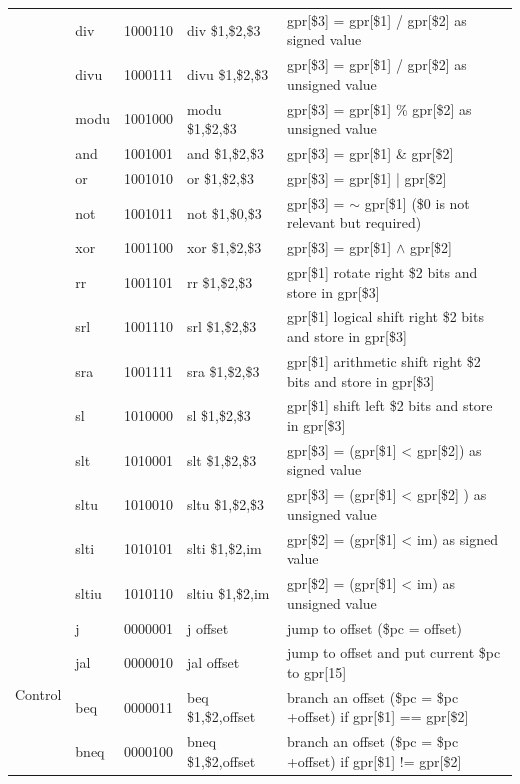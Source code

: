 \documentclass{sig-alternate}
\begin{document}
\begin{table}[p]
\begin{tabular}{|c|l|c|l|p{8cm}|}
 & div & 1000110 & div \$1,\$2,\$3 & gpr[\$3] = gpr[\$1] / gpr[\$2] as signed value \\ \cline{2-5}
 & divu & 1000111 & divu \$1,\$2,\$3 & gpr[\$3] = gpr[\$1] / gpr[\$2] as unsigned value \\ \cline{2-5}
 & modu & 1001000 & modu \$1,\$2,\$3 & gpr[\$3] = gpr[\$1] \% gpr[\$2] as unsigned value \\ \cline{2-5}
 & and & 1001001 & and \$1,\$2,\$3 & gpr[\$3] = gpr[\$1] \& gpr[\$2] \\ \cline{2-5}  
 & or & 1001010 & or \$1,\$2,\$3 & gpr[\$3] = gpr[\$1] | gpr[\$2] \\ \cline{2-5}
 & not & 1001011 & not \$1,\$0,\$3 & gpr[\$3] = $\sim$ gpr[\$1]  (\$0 is not relevant but required) \\ \cline{2-5}
 & xor & 1001100 & xor \$1,\$2,\$3 & gpr[\$3] = gpr[\$1] $\wedge$ gpr[\$2] \\ \cline{2-5}
 & rr & 1001101 & rr \$1,\$2,\$3 &  gpr[\$1] rotate right \$2 bits and store in gpr[\$3] \\ \cline{2-5}
 & srl & 1001110 & srl \$1,\$2,\$3 & gpr[\$1] logical shift right \$2 bits and store in gpr[\$3]  \\ \cline{2-5}  
 & sra & 1001111 & sra \$1,\$2,\$3 & gpr[\$1] arithmetic shift right \$2 bits and store in gpr[\$3]  \\ \cline{2-5}
 & sl & 1010000 & sl \$1,\$2,\$3 & gpr[\$1] shift left \$2 bits and store in gpr[\$3]  \\ \cline{2-5}
 & slt & 1010001 & slt \$1,\$2,\$3 & gpr[\$3] = (gpr[\$1] < gpr[\$2]) as signed value \\ \cline{2-5}
 & sltu & 1010010 & sltu \$1,\$2,\$3 &  gpr[\$3] = (gpr[\$1] < gpr[\$2] ) as unsigned value \\ \cline{2-5}
 & slti &1010101 & slti \$1,\$2,im & gpr[\$2] = (gpr[\$1] < im) as signed value \\ \cline{2-5}
 & sltiu & 1010110 & sltiu \$1,\$2,im &  gpr[\$2] = (gpr[\$1] < im) as unsigned value\\ \hline
\multirow{9}{*}{Control} & j & 0000001 & j offset & jump to offset (\$pc = offset) \\ \cline{2-5}
 & jal & 0000010 & jal offset & jump to offset and put current \$pc to gpr[15] \\ \cline{2-5}  
 & beq & 0000011 & beq \$1,\$2,offset & branch an offset (\$pc = \$pc +offset) if gpr[\$1] == gpr[\$2] \\ \cline{2-5}
 & bneq & 0000100 & bneq \$1,\$2,offset & branch an offset (\$pc = \$pc +offset) if gpr[\$1] != gpr[\$2] \\ \cline{2-5}

\end{tabular}
\end{table}
\end{document}

